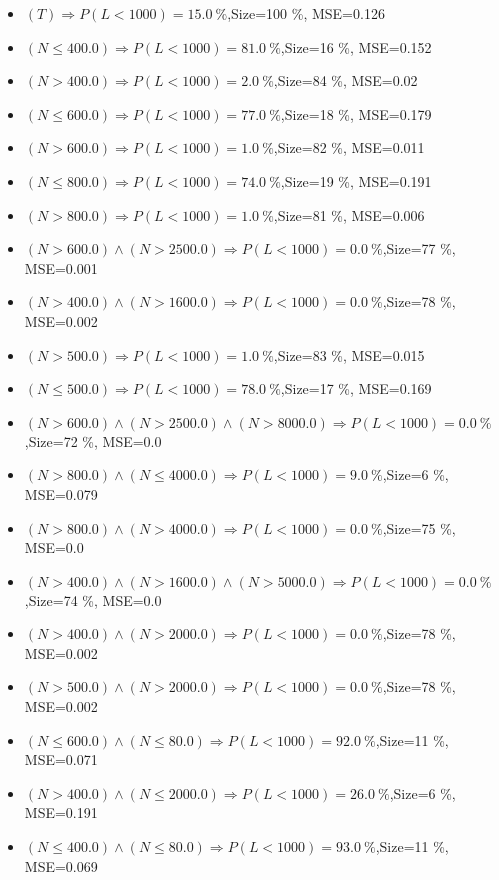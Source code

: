 \documentclass[numbered]{CSL}
\begin{document}
\begin{itemize}
\item $(T) \Rightarrow P(L < 1 000) = 15.0~\%$,\hfill Size=100 \%, MSE=0.126
\item $(N \leq 400.0) \Rightarrow P(L < 1 000) = 81.0~\%$,\hfill Size=16 \%, MSE=0.152
\item $(N > 400.0) \Rightarrow P(L < 1 000) = 2.0~\%$,\hfill Size=84 \%, MSE=0.02
\item $(N \leq 600.0) \Rightarrow P(L < 1 000) = 77.0~\%$,\hfill Size=18 \%, MSE=0.179
\item $(N > 600.0) \Rightarrow P(L < 1 000) = 1.0~\%$,\hfill Size=82 \%, MSE=0.011
\item $(N \leq 800.0) \Rightarrow P(L < 1 000) = 74.0~\%$,\hfill Size=19 \%, MSE=0.191
\item $(N > 800.0) \Rightarrow P(L < 1 000) = 1.0~\%$,\hfill Size=81 \%, MSE=0.006
\item $(N > 600.0) \land (N > 2500.0) \Rightarrow P(L < 1 000) = 0.0~\%$,\hfill Size=77 \%, MSE=0.001
\item $(N > 400.0) \land (N > 1600.0) \Rightarrow P(L < 1 000) = 0.0~\%$,\hfill Size=78 \%, MSE=0.002
\item $(N > 500.0) \Rightarrow P(L < 1 000) = 1.0~\%$,\hfill Size=83 \%, MSE=0.015
\item $(N \leq 500.0) \Rightarrow P(L < 1 000) = 78.0~\%$,\hfill Size=17 \%, MSE=0.169
\item $(N > 600.0) \land (N > 2500.0) \land (N > 8000.0) \Rightarrow P(L < 1 000) = 0.0~\%$,\hfill Size=72 \%, MSE=0.0
\item $(N > 800.0) \land (N \leq 4000.0) \Rightarrow P(L < 1 000) = 9.0~\%$,\hfill Size=6 \%, MSE=0.079
\item $(N > 800.0) \land (N > 4000.0) \Rightarrow P(L < 1 000) = 0.0~\%$,\hfill Size=75 \%, MSE=0.0
\item $(N > 400.0) \land (N > 1600.0) \land (N > 5000.0) \Rightarrow P(L < 1 000) = 0.0~\%$,\hfill Size=74 \%, MSE=0.0
\item $(N > 400.0) \land (N > 2000.0) \Rightarrow P(L < 1 000) = 0.0~\%$,\hfill Size=78 \%, MSE=0.002
\item $(N > 500.0) \land (N > 2000.0) \Rightarrow P(L < 1 000) = 0.0~\%$,\hfill Size=78 \%, MSE=0.002
\item $(N \leq 600.0) \land (N \leq 80.0) \Rightarrow P(L < 1 000) = 92.0~\%$,\hfill Size=11 \%, MSE=0.071
\item $(N > 400.0) \land (N \leq 2000.0) \Rightarrow P(L < 1 000) = 26.0~\%$,\hfill Size=6 \%, MSE=0.191
\item $(N \leq 400.0) \land (N \leq 80.0) \Rightarrow P(L < 1 000) = 93.0~\%$,\hfill Size=11 \%, MSE=0.069
\end{itemize}
\end{document}
